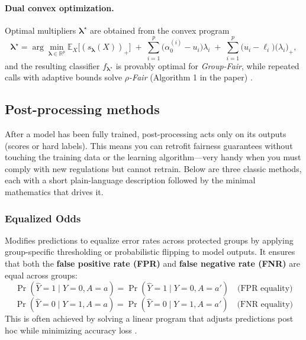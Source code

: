 \documentclass[12pt,a4paper,openright,twoside]{book}
\begin{document}
\paragraph{Dual convex optimization.}
Optimal multipliers $\boldsymbol\lambda^\star$ are obtained from the convex program \cite{celis2020classificationfairnessconstraintsmetaalgorithm}
\[
\boldsymbol\lambda^\star=\arg\min_{\boldsymbol\lambda\in\mathbb{R}^p}
    \mathbb{E}_X\!\bigl[(s_{\boldsymbol\lambda}(X))_+\bigr]
    \;+\;
    \sum_{i=1}^{p}\bigl(\alpha^{(i)}_0-u_i\bigr)\lambda_i
    \;+\;
    \sum_{i=1}^{p}\bigl(u_i-\ell_i\bigr)\bigl(\lambda_i\bigr)_+,
\]
and the resulting classifier $f_{\boldsymbol\lambda^\star}$ is provably optimal for \emph{Group-Fair}, while repeated calls with adaptive bounds solve \emph{$\rho$-Fair} (Algorithm 1 in the paper) \cite{celis2020classificationfairnessconstraintsmetaalgorithm}.


\subsection{Post-processing methods} 
After a model has been fully trained, post-processing acts only on its outputs (scores or hard labels).
This means you can retrofit fairness guarantees without touching the training data or the learning algorithm—very handy when you must comply with new regulations but cannot retrain.
Below are three classic methods, each with a short plain-language description followed by the minimal mathematics that drives it.

\subsubsection{Equalized Odds} Modifies predictions to equalize error rates across protected groups by applying group-specific thresholding or probabilistic flipping to model outputs. It ensures that both the \textbf{false positive rate (FPR)} and \textbf{false negative rate (FNR)} are equal across groups:
\begin{equation}
    \Pr(\hat{Y} = 1 \mid Y = 0, A = a) = \Pr(\hat{Y} = 1 \mid Y = 0, A = a') \quad\text{(FPR equality)}
\end{equation}
\begin{equation}
    \Pr(\hat{Y} = 0 \mid Y = 1, A = a) = \Pr(\hat{Y} = 0 \mid Y = 1, A = a') \quad\text{(FNR equality)}
\end{equation}
This is often achieved by solving a linear program that adjusts predictions post hoc while minimizing accuracy loss \cite{hardt2016equalityopportunitysupervisedlearning}.
\end{document}

